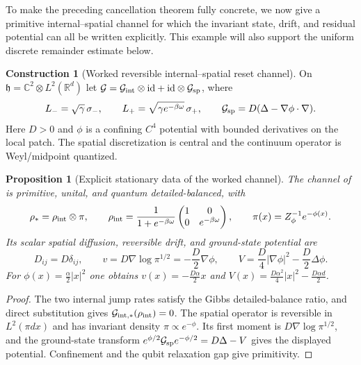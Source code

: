 \documentclass[11pt]{article}
\newtheorem{proposition}[theorem]{Proposition}
\theoremstyle{definition}
\newtheorem{construction}[theorem]{Construction}
\theoremstyle{remark}
\newcommand{\R}{\mathbb R}
\newcommand{\C}{\mathbb C}
\newcommand{\id}{\mathrm{id}}
\newcommand{\rstar}{\rho_*}
\begin{document}
To make the preceding cancellation theorem fully concrete, we now give a
primitive internal--spatial channel for which the invariant state, drift, and
residual potential can all be written explicitly. This example will also
support the uniform discrete remainder estimate below.

\begin{construction}[Worked reversible internal--spatial reset channel]
\label{constr:worked-reset-channel}
On $\mathfrak h=\C^2\otimes L^2(\R^d)$ let
$\mathcal G=\mathcal G_{\rm int}\otimes\id+\id\otimes\mathcal G_{\rm sp}$,
where
\[
 L_-=\sqrt\gamma\,\sigma_-,\qquad
 L_+=\sqrt{\gamma e^{-\beta\omega}}\,\sigma_+,
 \qquad
 \mathcal G_{\rm sp}=D(\Delta-\nabla\phi\cdot\nabla).
\]
Here $D>0$ and $\phi$ is a confining $C^4$ potential with bounded derivatives on
the local patch.  The spatial discretization is central and the continuum
operator is Weyl/midpoint quantized.
\end{construction}

\begin{proposition}[Explicit stationary data of the worked channel]
\label{prop:worked-reset-data}
The channel of  is primitive, unital, and
quantum detailed-balanced, with
\[
 \rstar=\rho_{\rm int}\otimes\pi,\qquad
 \rho_{\rm int}=\frac1{1+e^{-\beta\omega}}
 \begin{pmatrix}1&0\\0&e^{-\beta\omega}\end{pmatrix},
 \qquad \pi(x)=Z_\phi^{-1}e^{-\phi(x)}.
\]
Its scalar spatial diffusion, reversible drift, and ground-state potential are
\[
 D_{ij}=D\delta_{ij},\qquad
 v=D\nabla\log\pi^{1/2}=-\frac D2\nabla\phi,
 \qquad
 V=\frac D4|\nabla\phi|^2-\frac D2\Delta\phi.
\]
For $\phi(x)=\frac\alpha2|x|^2$ one obtains
$v(x)=-\frac{D\alpha}{2}x$ and
$V(x)=\frac{D\alpha^2}{4}|x|^2-\frac{D\alpha d}{2}$.
\end{proposition}

\begin{proof}
The two internal jump rates satisfy the Gibbs detailed-balance ratio, and direct
substitution gives $\mathcal G_{\rm int,*}(\rho_{\rm int})=0$.  The spatial
operator is reversible in $L^2(\pi dx)$ and has invariant density
$\pi\propto e^{-\phi}$.  Its first moment is
$D\nabla\log\pi^{1/2}$, and the ground-state transform
$e^{\phi/2}\mathcal G_{\rm sp}e^{-\phi/2}=D\Delta-V$ gives the displayed
potential.  Confinement and the qubit relaxation gap give primitivity.
\end{proof}
\end{document}
